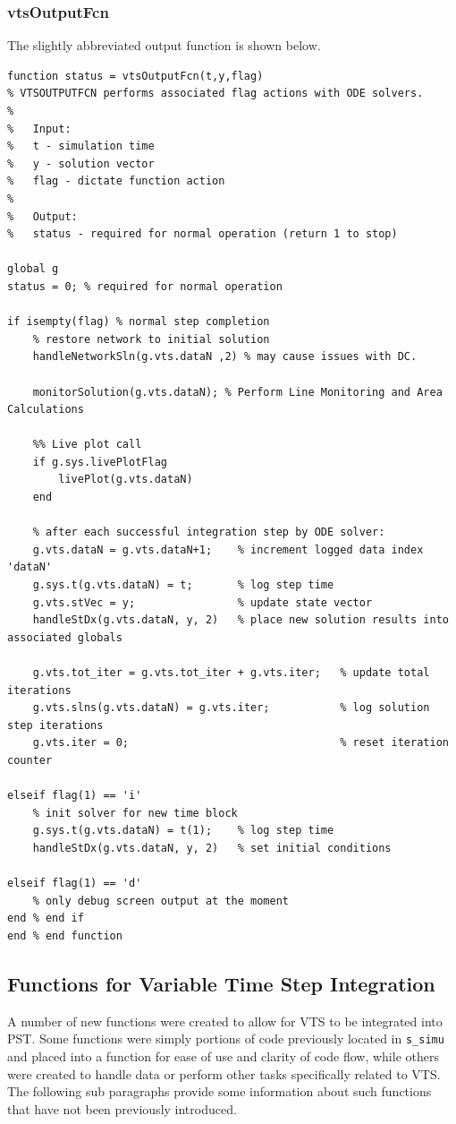 \subsubsection{vtsOutputFcn} 
The slightly abbreviated output function is shown below.
\begin{verbatim}
function status = vtsOutputFcn(t,y,flag)
% VTSOUTPUTFCN performs associated flag actions with ODE solvers.
%
%   Input:
%   t - simulation time
%   y - solution vector
%   flag - dictate function action
%
%   Output:
%   status - required for normal operation (return 1 to stop)

global g 
status = 0; % required for normal operation

if isempty(flag) % normal step completion
    % restore network to initial solution
    handleNetworkSln(g.vts.dataN ,2) % may cause issues with DC.
    
    monitorSolution(g.vts.dataN); % Perform Line Monitoring and Area Calculations 
    
    %% Live plot call
    if g.sys.livePlotFlag
        livePlot(g.vts.dataN)
    end
    
    % after each successful integration step by ODE solver:
    g.vts.dataN = g.vts.dataN+1;    % increment logged data index 'dataN'
    g.sys.t(g.vts.dataN) = t;       % log step time
    g.vts.stVec = y;                % update state vector
    handleStDx(g.vts.dataN, y, 2)   % place new solution results into associated globals
    
    g.vts.tot_iter = g.vts.tot_iter + g.vts.iter;   % update total iterations
    g.vts.slns(g.vts.dataN) = g.vts.iter;           % log solution step iterations
    g.vts.iter = 0;                                 % reset iteration counter
    
elseif flag(1) == 'i' 
    % init solver for new time block
    g.sys.t(g.vts.dataN) = t(1);    % log step time
    handleStDx(g.vts.dataN, y, 2)   % set initial conditions
  
elseif flag(1) == 'd'
    % only debug screen output at the moment
end % end if
end % end function
\end{verbatim}

\subsection{Functions for Variable Time Step Integration}  
A number of new functions were created to allow for VTS to be integrated into PST.
Some functions were simply portions of code previously located in \verb|s_simu| and placed into a function for ease of use and clarity of code flow, while others were created to handle data or perform other tasks specifically related to VTS.
The following sub paragraphs provide some information about such functions that have not been previously introduced.

